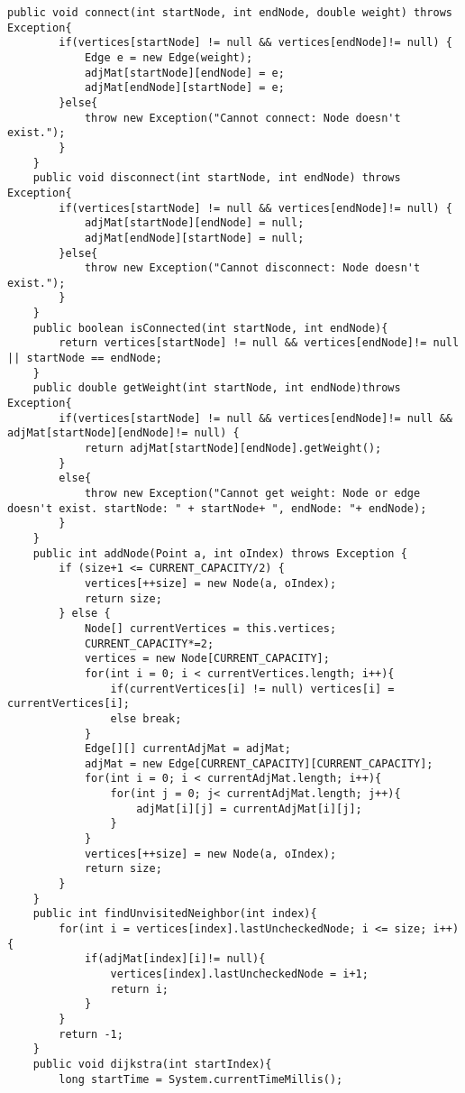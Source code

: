 \documentclass[a4paper,10pt,ngerman]{scrartcl}
\begin{document}
\begin{lstlisting}[frame=single]
    public void connect(int startNode, int endNode, double weight) throws Exception{
        if(vertices[startNode] != null && vertices[endNode]!= null) {
            Edge e = new Edge(weight);
            adjMat[startNode][endNode] = e;
            adjMat[endNode][startNode] = e;
        }else{
            throw new Exception("Cannot connect: Node doesn't exist.");
        }
    }
    public void disconnect(int startNode, int endNode) throws Exception{
        if(vertices[startNode] != null && vertices[endNode]!= null) {
            adjMat[startNode][endNode] = null;
            adjMat[endNode][startNode] = null;
        }else{
            throw new Exception("Cannot disconnect: Node doesn't exist.");
        }
    }
    public boolean isConnected(int startNode, int endNode){
        return vertices[startNode] != null && vertices[endNode]!= null || startNode == endNode;
    }
    public double getWeight(int startNode, int endNode)throws Exception{
        if(vertices[startNode] != null && vertices[endNode]!= null && adjMat[startNode][endNode]!= null) {
            return adjMat[startNode][endNode].getWeight();
        }
        else{
            throw new Exception("Cannot get weight: Node or edge doesn't exist. startNode: " + startNode+ ", endNode: "+ endNode);
        }
    }
    public int addNode(Point a, int oIndex) throws Exception {
        if (size+1 <= CURRENT_CAPACITY/2) {
            vertices[++size] = new Node(a, oIndex);
            return size;
        } else {
            Node[] currentVertices = this.vertices;
            CURRENT_CAPACITY*=2;
            vertices = new Node[CURRENT_CAPACITY];
            for(int i = 0; i < currentVertices.length; i++){
                if(currentVertices[i] != null) vertices[i] = currentVertices[i];
                else break;
            }
            Edge[][] currentAdjMat = adjMat;
            adjMat = new Edge[CURRENT_CAPACITY][CURRENT_CAPACITY];
            for(int i = 0; i < currentAdjMat.length; i++){
                for(int j = 0; j< currentAdjMat.length; j++){
                    adjMat[i][j] = currentAdjMat[i][j];
                }
            }
            vertices[++size] = new Node(a, oIndex);
            return size;
        }
    }
    public int findUnvisitedNeighbor(int index){
        for(int i = vertices[index].lastUncheckedNode; i <= size; i++){
            if(adjMat[index][i]!= null){
                vertices[index].lastUncheckedNode = i+1;
                return i;
            }
        }
        return -1;
    }
    public void dijkstra(int startIndex){
        long startTime = System.currentTimeMillis();

\end{lstlisting}
\end{document}
